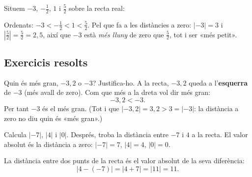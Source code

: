\begin{exemple}
Situem $-3$, $-\tfrac{1}{2}$, $1$ i $\tfrac{5}{2}$ sobre la recta real:

\begin{center}
\end{center}

\noindent Ordenats: $-3<-\tfrac{1}{2}<1<\tfrac{5}{2}$. Pel que fa a les distàncies a
zero: $|{-3}|=3$ i $\left|\tfrac{5}{2}\right|=\tfrac{5}{2}=2,5$, així que $-3$ està
\emph{més lluny} de zero que $\tfrac{5}{2}$, tot i ser «més petit».
\end{exemple}

\subsection{Exercicis resolts}

\begin{exresolt}
Quin és més gran, $-3,2$ o $-3$? Justifica-ho.
\solucio
A la recta, $-3,2$ queda a l'\textbf{esquerra} de $-3$ (més avall de zero). Com que
més a la dreta vol dir més gran:
\[
-3,2 < -3.
\]
Per tant $-3$ és el més gran. (Tot i que $|{-3,2}|=3,2>3=|{-3}|$: la distància a zero
no diu quin és «més gran».)
\end{exresolt}

\begin{exresolt}
Calcula $|{-7}|$, $|4|$ i $|0|$. Després, troba la distància entre $-7$ i $4$ a la
recta.
\solucio
El valor absolut és la distància a zero: $|{-7}|=7$, $|4|=4$, $|0|=0$.

La distància entre dos punts de la recta és el valor absolut de la seva diferència:
\[
|4-(-7)|=|4+7|=|11|=11.
\]
\end{exresolt}

